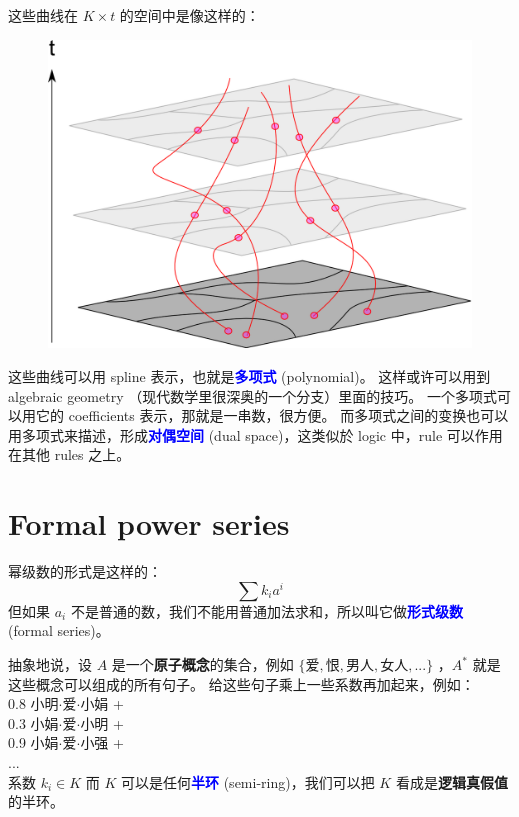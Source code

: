 \documentclass[12pt]{article}
\newcommand{\concept}[1]{\textbf{\textcolor{blue}{#1}}}
\newcommand{\formula}[1]{\textcolor{LogicColor}{#1}}
\newcommand{\tab}{\hspace*{1cm}}
\begin{document}
这些曲线在 $K \times t$ 的空间中是像这样的：
\begin{figure}[H]
\centering
\includegraphics[scale=0.75]{polynomial-hairs.png}
\end{figure}

这些曲线可以用 spline 表示，也就是\concept{多项式} (polynomial)。  这样或许可以用到 algebraic geometry （现代数学里很深奥的一个分支）里面的技巧。  一个多项式可以用它的 coefficients 表示，那就是一串数，很方便。 而多项式之间的变换也可以用多项式来描述，形成\concept{对偶空间} (dual space)，这类似於 logic 中，rule 可以作用在其他 rules 之上。 

\section{Formal power series}

幂级数的形式是这样的：
$$ \sum k_i a^i $$
但如果 $a_i$ 不是普通的数，我们不能用普通加法求和，所以叫它做\concept{形式级数} (formal series)。

抽象地说，设 $A$ 是一个\textbf{原子概念}的集合，例如 $\{ \mbox{爱}, \mbox{恨}, \mbox{男人}, \mbox{女人}, ... \}$ ，$A^*$ 就是这些概念可以组成的所有句子。 给这些句子乘上一些系数再加起来，例如：\\
\tab 0.8 \formula{小明$\cdot$爱$\cdot$小娟} + \\
\tab 0.3 \formula{小娟$\cdot$爱$\cdot$小明} + \\
\tab 0.9 \formula{小娟$\cdot$爱$\cdot$小强} + \\
\tab ... \\
系数 $k_i \in K$ 而 $K$ 可以是任何\concept{半环} (semi-ring)，我们可以把 $K$ 看成是\textbf{逻辑真假值}的半环。 
\end{document}
